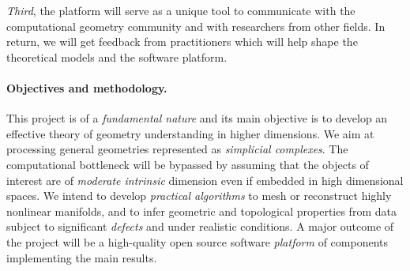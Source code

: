 {\em Third}, the platform will serve as a unique tool to communicate with the computational geometry community and with researchers from other fields. 
 In return, we will get feedback from practitioners which will help shape the theoretical models and the software platform.


 




\paragraph{Objectives and methodology.}
This project is of a {\em fundamental nature} and its main objective is to develop an effective theory of geometry understanding in higher dimensions. We aim at processing general geometries represented as {\em simplicial complexes}. The computational bottleneck will be bypassed by assuming that the objects of interest are of {\em moderate intrinsic} dimension even if embedded in high dimensional spaces. We intend to develop {\em practical algorithms} to mesh or reconstruct highly nonlinear manifolds, and to infer geometric and topological properties from data subject to significant {\em defects} and
 under realistic conditions. A major outcome of the project will be a high-quality open source software {\em platform} of components implementing the main results.

